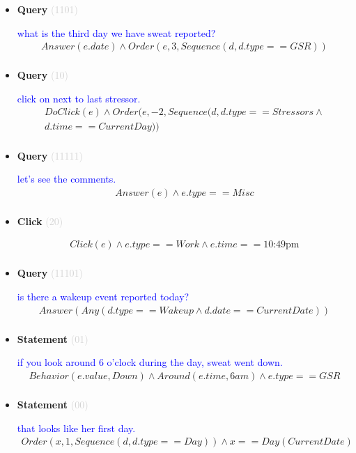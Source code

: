\documentclass[11pt]{article}
\newcommand{\key}[1]{\textcolor{lightgray}{#1}}
\newcounter{CQuery}
\newcounter{CStatement}
\newcounter{CClick}
\begin{document}
\begin{itemize}
\item
\textbf{Query\theCQuery} \key{(1101)} \addtocounter{CQuery}{1}
\textcolor{blue}{ what is the third day we have sweat reported? }
\begin{multline*}
Answer(e.date) \wedge Order(e, 3, Sequence(d, d.type==GSR)) \\ 
\end{multline*}


\item
\textbf{Query\theCQuery} \key{(10)} \addtocounter{CQuery}{1}
\textcolor{blue}{ click on next to last stressor. }
\begin{multline*}
DoClick(e) \wedge  Order(e, -2, Sequence(d, d.type==Stressors \wedge \\ 
d.time==CurrentDay)) \\ 
\end{multline*}


\item
\textbf{Query\theCQuery} \key{(11111)} \addtocounter{CQuery}{1}
\textcolor{blue}{ let's see the comments. }
\begin{multline*}
Answer(e) \wedge e.type==Misc \\ 
\end{multline*}


\item
\textbf{Click\theCClick} \key{(20)} \addtocounter{CClick}{1}
\textcolor{blue}{  }
\begin{multline*}
Click(e) \wedge e.type==Work \wedge e.time==\mbox{10:49pm} \\ 
\end{multline*}


\item
\textbf{Query\theCQuery} \key{(11101)} \addtocounter{CQuery}{1}
\textcolor{blue}{ is there a wakeup event reported today? }
\begin{multline*}
Answer(Any(d.type==Wakeup \wedge d.date==CurrentDate)) \\ 
\end{multline*}


\item
\textbf{Statement\theCStatement} \key{(01)} \addtocounter{CStatement}{1}
\textcolor{blue}{ if you look around 6 o'clock during the day, sweat went down. }
\begin{multline*}
Behavior(e.value, Down) \wedge Around(e.time, 6am) \wedge e.type==GSR \\ 
\end{multline*}


\item
\textbf{Statement\theCStatement} \key{(00)} \addtocounter{CStatement}{1}
\textcolor{blue}{ that looks like her first day. }
\begin{multline*}
Order(x, 1, Sequence(d, d.type==Day)) \wedge x==Day(CurrentDate) \\ 
\end{multline*}



\end{itemize}
\end{document}
